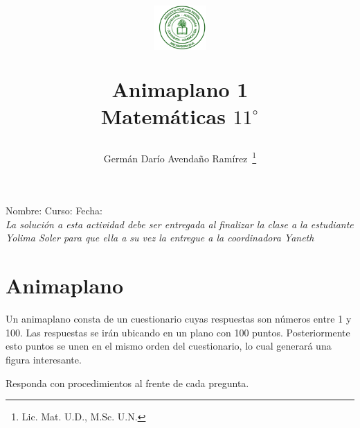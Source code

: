 \documentclass[11pt,twoside]{article}
\author{Germ\'an Dar\'io Avenda\~no Ram\'irez~\thanks{Lic. Mat. U.D., M.Sc. U.N.}}
\title{\begin{minipage}{0.15\textwidth}\includegraphics[height=1.7cm]{Images/logo-colegio.png}
\end{minipage}\hfill \begin{minipage}{0.85\textwidth}\begin{center}
Animaplano 1\\Matemáticas $11^{\circ}$\end{center}
\end{minipage}}
\date{}
\begin{document}
\maketitle
Nombre: \hrulefill Curso: \underline{\hspace{1cm}}  Fecha: \underline{\hspace{2cm}}\\

\emph{La solución a esta actividad debe ser entregada al finalizar la clase a la estudiante Yolima Soler para que ella a su vez la entregue a la coordinadora Yaneth}
\section{Animaplano}
Un animaplano consta de un cuestionario cuyas respuestas son números entre 1 y 100. Las respuestas se irán ubicando en un plano con 100 puntos. Posteriormente esto puntos se unen en el mismo orden del cuestionario, lo cual generará una figura interesante.

Responda con procedimientos al frente de cada pregunta.
\end{document}
